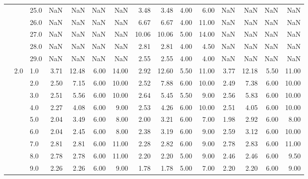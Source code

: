 \begin{tabular}{lllrrrrrrrrrrrr}
        &     & 25.0 &        NaN &       NaN &  NaN &    NaN &       3.48 &      3.48 & 4.00 &   6.00 &        NaN &       NaN &  NaN &    NaN \\
        &     & 26.0 &        NaN &       NaN &  NaN &    NaN &       6.67 &      6.67 & 4.00 &  11.00 &        NaN &       NaN &  NaN &    NaN \\
        &     & 27.0 &        NaN &       NaN &  NaN &    NaN &      10.06 &     10.06 & 5.00 &  14.00 &        NaN &       NaN &  NaN &    NaN \\
        &     & 28.0 &        NaN &       NaN &  NaN &    NaN &       2.81 &      2.81 & 4.00 &   4.50 &        NaN &       NaN &  NaN &    NaN \\
        &     & 29.0 &        NaN &       NaN &  NaN &    NaN &       2.55 &      2.55 & 4.00 &   4.00 &        NaN &       NaN &  NaN &    NaN \\
        & 2.0 & 1.0  &       3.71 &     12.48 & 6.00 &  14.00 &       2.92 &     12.60 & 5.50 &  11.00 &       3.77 &     12.18 & 5.50 &  11.00 \\
        &     & 2.0  &       2.50 &      7.15 & 6.00 &  10.00 &       2.52 &      7.88 & 6.00 &  10.00 &       2.49 &      7.38 & 6.00 &  10.00 \\
        &     & 3.0  &       2.51 &      5.56 & 6.00 &  10.00 &       2.64 &      5.45 & 5.50 &   9.00 &       2.56 &      5.83 & 6.00 &  10.00 \\
        &     & 4.0  &       2.27 &      4.08 & 6.00 &   9.00 &       2.53 &      4.26 & 6.00 &  10.00 &       2.51 &      4.05 & 6.00 &  10.00 \\
        &     & 5.0  &       2.04 &      3.49 & 6.00 &   8.00 &       2.00 &      3.21 & 6.00 &   7.00 &       1.98 &      2.92 & 6.00 &   8.00 \\
        &     & 6.0  &       2.04 &      2.45 & 6.00 &   8.00 &       2.38 &      3.19 & 6.00 &   9.00 &       2.59 &      3.12 & 6.00 &  10.00 \\
        &     & 7.0  &       2.81 &      2.81 & 6.00 &  11.00 &       2.28 &      2.82 & 6.00 &   9.00 &       2.78 &      2.83 & 6.00 &  11.00 \\
        &     & 8.0  &       2.78 &      2.78 & 6.00 &  11.00 &       2.20 &      2.20 & 5.00 &   9.00 &       2.46 &      2.46 & 6.00 &   9.50 \\
        &     & 9.0  &       2.26 &      2.26 & 6.00 &   9.00 &       1.78 &      1.78 & 5.00 &   7.00 &       2.20 &      2.20 & 6.00 &   9.00 \\

\end{tabular}

